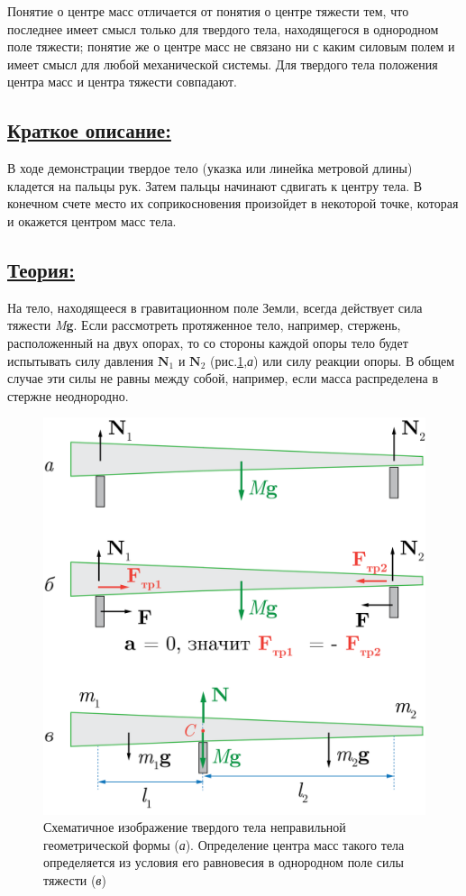 \documentclass[14pt,a4paper,oneside]{extarticle}	%
\begin{document}
	Понятие о центре масс отличается от понятия о центре тяжести тем, 
	что последнее имеет смысл только для твердого тела, находящегося в однородном поле тяжести;
	понятие же о центре масс не связано ни с каким силовым полем и имеет смысл для любой механической системы. 
	Для твердого тела положения центра масс и центра тяжести совпадают. 
	
\subsection*{\underline{Краткое описание:}}
	
В ходе демонстрации твердое тело (указка или линейка метровой длины) кладется на пальцы рук.
Затем пальцы начинают сдвигать к центру тела.
В конечном счете место их соприкосновения произойдет в некоторой точке, которая и окажется центром масс тела.

\subsection*{\underline{Теория:}}
		
		На тело, находящееся в гравитационном поле Земли, всегда действует сила тяжести \textit{M}\textbf{g}.
		Если рассмотреть протяженное тело, например, стержень, расположенный на двух опорах, то со стороны каждой опоры тело будет испытывать силу давления $ \textbf{N}_1 $ и $ \textbf{N}_2 $ (рис.\ref{center-2},\textit{а}) или силу реакции опоры.
		В общем случае эти силы не равны между собой, например, если масса распределена в стержне неоднородно.
		\begin{figure}[H] 	
			\centering 	
			\includegraphics[width=0.6\linewidth]{center-2.png}
			\caption{Схематичное изображение твердого тела неправильной геометрической формы (\textit{а}). 
				Определение центра масс такого тела определяется из условия его равновесия в однородном поле силы тяжести (\textit{в})}
			\label{center-2}
		\end{figure}
	
\end{document}

